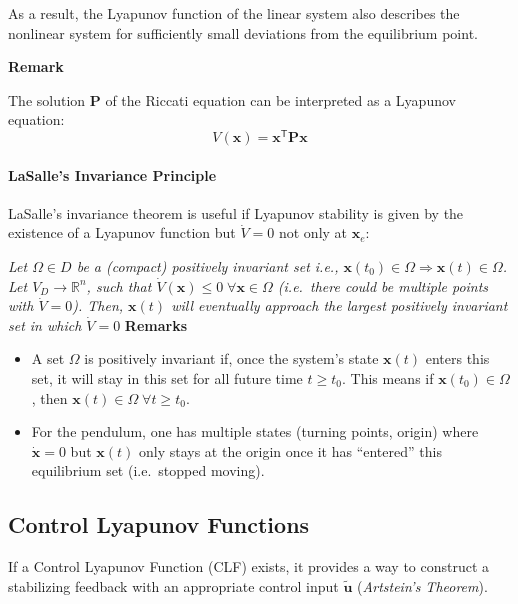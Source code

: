 \newpar{}
As a result, the Lyapunov function of the linear system also describes the nonlinear system for sufficiently small deviations from the equilibrium point.

\newpar{}
\textbf{Remark}

The solution $\mathbf{P}$ of the Riccati equation can be interpreted as a Lyapunov equation:
\noindent\begin{equation*}
    V(\mathbf{x}) = \mathbf{x}^{\mathsf{T}} \mathbf{Px}
\end{equation*}

\paragraph{LaSalle's Invariance Principle}
LaSalle's invariance theorem is useful if Lyapunov stability is given by the existence of a Lyapunov function but $\dot{V}=0$ not only at $\mathbf{x}_e$:

\newpar{}
\textit{Let $\Omega\in D$ be a (compact) positively invariant set i.e., $\mathbf{x}(t_0)\in \Omega \Rightarrow \mathbf{x}(t)\in\Omega$.
    Let $V_D\to \mathbb{R}^n$, such that $\dot{V}(\mathbf{x})\leq 0\; \forall \mathbf{x}\in \Omega$ (i.e.\ there could be multiple points with $\dot{V}=0$).
    Then, $\mathbf{x}(t)$ will eventually approach the largest positively invariant set in which $\dot{V}=0$
}
\newpar{}
\textbf{Remarks}
\begin{itemize}
    \item A set $\Omega$ is positively invariant if, once the system's state $\mathbf{x}(t)$ enters this set, it will stay in this set for all future time $t \geq t_0$. This means if $\mathbf{x}(t_0) \in \Omega$, then $\mathbf{x}(t) \in \Omega\; \forall t \geq t_0$.
    \item For the pendulum, one has multiple states (turning points, origin) where $\dot{\mathbf{x}}=0$ but $\mathbf{x}(t)$ only stays at the origin once it has ``entered'' this equilibrium set (i.e.\ stopped moving).
\end{itemize}

\subsection{Control Lyapunov Functions}
If a Control Lyapunov Function (CLF) exists, it provides a way to construct a stabilizing feedback with an appropriate control input $\tilde{\mathbf{u}}$ (\textit{Artstein's Theorem}).

